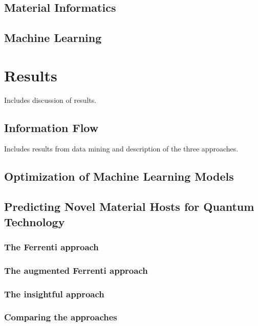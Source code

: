\documentclass[superscriptaddress,unsortedaddress,
 amsmath,amssymb,
 aps,
]{revtex4-2}
\begin{document}
\subsection*{Material Informatics} %

\subsection*{Machine Learning} %

\section*{Results}
Includes discussion of results.  

\subsection*{Information Flow}  %
Includes results from data mining and description of the three approaches. 

\subsection*{Optimization of Machine Learning Models} %

\subsection*{Predicting Novel Material Hosts for Quantum Technology} %
\subsubsection*{The Ferrenti approach} 
\subsubsection*{The augmented Ferrenti approach}
\subsubsection*{The insightful approach}
\subsubsection*{Comparing the approaches}
\end{document}
